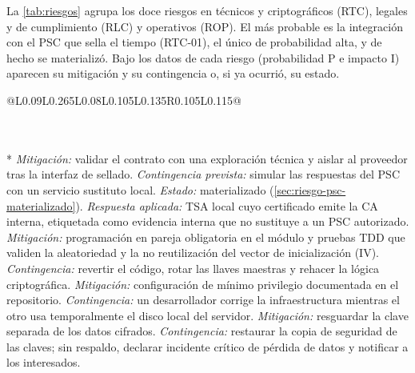 La \cref{tab:riesgos} agrupa los doce riesgos en técnicos y criptográficos (RTC), legales y de cumplimiento (RLC) y operativos (ROP). El más probable es la integración con el PSC que sella el tiempo (RTC-01), el único de probabilidad alta, y de hecho se materializó. Bajo los datos de cada riesgo (probabilidad P e impacto I) aparecen su mitigación y su contingencia o, si ya ocurrió, su estado.

{\setlength{\tabcolsep}{4pt}
\begin{longtable}{@{}L{0.09\linewidth}L{0.265\linewidth}L{0.08\linewidth}L{0.105\linewidth}L{0.135\linewidth}R{0.105\linewidth}L{0.115\linewidth}@{}}
  \caption{Registro de riesgos del proyecto.}\label{tab:riesgos}\label{tab:rtc-01}\label{tab:rtc-02}\label{tab:rlc-01} \\
  \RiesgoEnc\endfirsthead
  \RiesgoEnc\endhead
  \bottomrule\endlastfoot
   \\* \addlinespace[2pt]
    {\textit{Mitigación:} validar el contrato con una exploración técnica y aislar al proveedor tras la interfaz de sellado. \textit{Contingencia prevista:} simular las respuestas del PSC con un servicio sustituto local. \textit{Estado:} materializado (\cref{sec:riesgo-psc-materializado}). \textit{Respuesta aplicada:} TSA local cuyo certificado emite la CA interna, etiquetada como evidencia interna que no sustituye a un PSC autorizado.}
    {\textit{Mitigación:} programación en pareja obligatoria en el módulo y pruebas TDD que validen la aleatoriedad y la no reutilización del vector de inicialización (IV). \textit{Contingencia:} revertir el código, rotar las llaves maestras y rehacer la lógica criptográfica.}
    {\textit{Mitigación:} configuración de mínimo privilegio documentada en el repositorio. \textit{Contingencia:} un desarrollador corrige la infraestructura mientras el otro usa temporalmente el disco local del servidor.}
    {\textit{Mitigación:} resguardar la clave separada de los datos cifrados. \textit{Contingencia:} restaurar la copia de seguridad de las claves; sin respaldo, declarar incidente crítico de pérdida de datos y notificar a los interesados.}

\end{longtable}}

